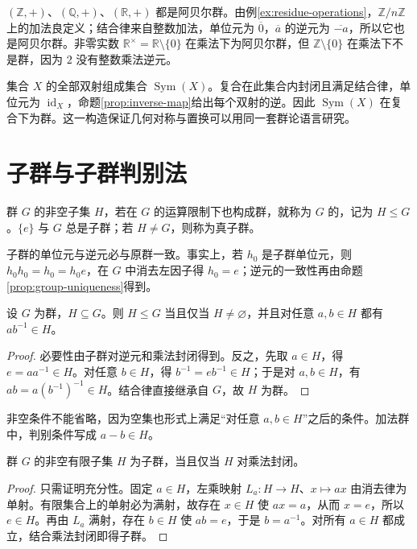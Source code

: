 \documentclass[UTF8,12pt,a4paper,fontset=fandol]{ctexbook}
\begin{document}
\begin{example}[加法群与乘法群]
$(\mathbb Z,+)$、$(\mathbb Q,+)$、$(\mathbb R,+)$ 都是阿贝尔群。由例\ref{ex:residue-operations}，$\mathbb Z/n\mathbb Z$ 上的加法良定义；结合律来自整数加法，单位元为 $\overline0$，$\overline a$ 的逆元为 $\overline{-a}$，所以它也是阿贝尔群。非零实数 $\mathbb R^\times=\mathbb R\setminus\{0\}$ 在乘法下为阿贝尔群，但 $\mathbb Z\setminus\{0\}$ 在乘法下不是群，因为 $2$ 没有整数乘法逆元。
\end{example}

\begin{example}[双射的复合]
集合 $X$ 的全部双射组成集合 $\operatorname{Sym}(X)$。复合在此集合内封闭且满足结合律，单位元为 $\operatorname{id}_X$，命题\ref{prop:inverse-map}给出每个双射的逆。因此 $\operatorname{Sym}(X)$ 在复合下为群。这一构造保证几何对称与置换可以用同一套群论语言研究。
\end{example}

\section{子群与子群判别法}\label{sec:subgroups}

\begin{definition}[子群]
群 $G$ 的非空子集 $H$，若在 $G$ 的运算限制下也构成群，就称为 $G$ 的，记为 $H\leq G$。$\{e\}$ 与 $G$ 总是子群；若 $H\ne G$，则称为真子群。
\end{definition}

子群的单位元与逆元必与原群一致。事实上，若 $h_0$ 是子群单位元，则 $h_0h_0=h_0=h_0e$，在 $G$ 中消去左因子得 $h_0=e$；逆元的一致性再由命题\ref{prop:group-uniqueness}得到。

\begin{theorem}[子群判别法]\label{thm:subgroup-test}
设 $G$ 为群，$H\subseteq G$。则 $H\leq G$ 当且仅当 $H\ne\varnothing$，并且对任意 $a,b\in H$ 都有 $ab^{-1}\in H$。
\end{theorem}
\begin{proof}
必要性由子群对逆元和乘法封闭得到。反之，先取 $a\in H$，得 $e=aa^{-1}\in H$。对任意 $b\in H$，得 $b^{-1}=eb^{-1}\in H$；于是对 $a,b\in H$，有 $ab=a(b^{-1})^{-1}\in H$。结合律直接继承自 $G$，故 $H$ 为群。
\end{proof}

非空条件不能省略，因为空集也形式上满足“对任意 $a,b\in H$”之后的条件。加法群中，判别条件写成 $a-b\in H$。

\begin{proposition}[有限子集的判别法]\label{prop:finite-subgroup-test}
群 $G$ 的非空有限子集 $H$ 为子群，当且仅当 $H$ 对乘法封闭。
\end{proposition}
\begin{proof}
只需证明充分性。固定 $a\in H$，左乘映射 $L_a:H\to H$、$x\mapsto ax$ 由消去律为单射。有限集合上的单射必为满射，故存在 $x\in H$ 使 $ax=a$，从而 $x=e$，所以 $e\in H$。再由 $L_a$ 满射，存在 $b\in H$ 使 $ab=e$，于是 $b=a^{-1}$。对所有 $a\in H$ 都成立，结合乘法封闭即得子群。
\end{proof}
\end{document}

